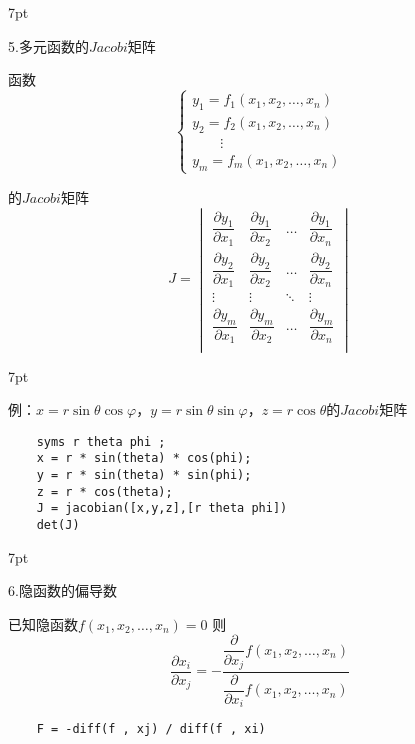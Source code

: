 \documentclass{article} %
\newenvironment{eg}{%
\def\FrameCommand{%
\hspace{1pt}%
{\color{Gray}\vrule width 2pt}%
{\color{egshade}\vrule width 4pt}%
\colorbox{egshade}%
}%
\MakeFramed{\advance\hsize-\width\FrameRestore}%
\noindent\hspace{-4.55pt}%
\begin{adjustwidth}{}{7pt}%
\vspace{2pt}\vspace{2pt}%
\normalfont %
}
{%
\vspace{2pt}\end{adjustwidth}\endMakeFramed%
}
\newenvironment{wa}{%
\def\FrameCommand{%
\hspace{1pt}%
{\color{LightCoral}\vrule width 2pt}%
{\color{washade}\vrule width 4pt}%
\colorbox{washade}%
}%
\MakeFramed{\advance\hsize-\width\FrameRestore}%
\noindent\hspace{-4.55pt}%
\begin{adjustwidth}{}{7pt}%
\vspace{2pt}\vspace{2pt}%
\normalfont %
}
{%
\vspace{2pt}\end{adjustwidth}\endMakeFramed%
}
\begin{document}
\begin{eg}
    5.多元函数的$Jacobi$矩阵

    函数$$\begin{cases}
        y_{1} = f_{1}(x_{1},x_{2},\dots,x_{n}) \\
        y_{2} = f_{2}(x_{1},x_{2},\dots,x_{n}) \\
         \quad \quad \vdots \quad \quad\\
        y_{m} = f_{m}(x_{1},x_{2},\dots,x_{n}) 
    \end{cases}$$

    的$Jacobi$矩阵
    $$J = 
    \begin{vmatrix}
        \dfrac{\partial y_{1}}{\partial x_{1}} & \dfrac{\partial y_{1}}{\partial x_{2}} & \dots & \dfrac{\partial y_{1}}{\partial x_{n}} \\
        \dfrac{\partial y_{2}}{\partial x_{1}} & \dfrac{\partial y_{2}}{\partial x_{2}} & \dots & \dfrac{\partial y_{2}}{\partial x_{n}} \\
        \vdots & \vdots & \ddots & \vdots \\
        \dfrac{\partial y_{m}}{\partial x_{1}} & \dfrac{\partial y_{m}}{\partial x_{2}} & \dots & \dfrac{\partial y_{m}}{\partial x_{n}} \\
    \end{vmatrix}$$
\end{eg}
\begin{wa}
    例：$x = r\sin \theta \cos \varphi$，$y = r\sin \theta \sin \varphi$，$z = r \cos \theta$的$Jacobi$矩阵
\end{wa}
\begin{lstlisting}
    syms r theta phi ;
    x = r * sin(theta) * cos(phi);
    y = r * sin(theta) * sin(phi);
    z = r * cos(theta);
    J = jacobian([x,y,z],[r theta phi])
    det(J)
\end{lstlisting}

\begin{eg}
    6.隐函数的偏导数

    已知隐函数$f(x_{1},x_{2},\dots,x_{n}) = 0$
    则$$\frac{\partial x_{i}}{\partial x_{j}} = -\frac{\dfrac{\partial}{\partial x_{j}} f(x_{1},x_{2},\dots,x_{n})}{\dfrac{\partial}{\partial x_{i}} f(x_{1},x_{2},\dots,x_{n})}$$
\end{eg}
\begin{lstlisting}
    F = -diff(f , xj) / diff(f , xi)
\end{lstlisting}
\end{document}
